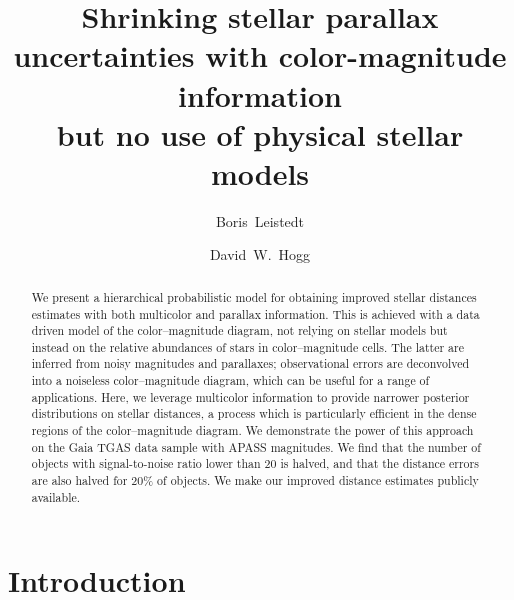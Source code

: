 \documentclass[aps,prd,showpacs,superscriptaddress,groupedaddress]{revtex4}  %
\begin{document}
 
\title{Shrinking stellar parallax uncertainties with color-magnitude information \\
  but no use of physical stellar models}

\author{Boris~Leistedt}
   
\author{David~W.~Hogg}
  
\begin{abstract}
We present a hierarchical probabilistic model for obtaining improved stellar distances estimates with both multicolor and parallax information. 
This is achieved with a data driven model of the color--magnitude diagram, not relying on stellar models but instead on the  relative abundances of stars in color--magnitude cells.
The latter are inferred from noisy magnitudes and parallaxes; observational errors are deconvolved into a noiseless color--magnitude diagram, which can be useful for a range of applications.
Here, we leverage multicolor information to provide narrower posterior distributions on stellar distances, a process which is particularly efficient in the dense regions of the color--magnitude diagram.
We demonstrate the power of this approach on the Gaia TGAS data sample with APASS magnitudes.
We find that the number of objects with signal-to-noise ratio lower than 20 is halved, and that the distance errors are also halved for 20\% of objects.
We make our improved distance estimates publicly available.
\end{abstract}


\maketitle

  
\section{Introduction}


\end{document}
